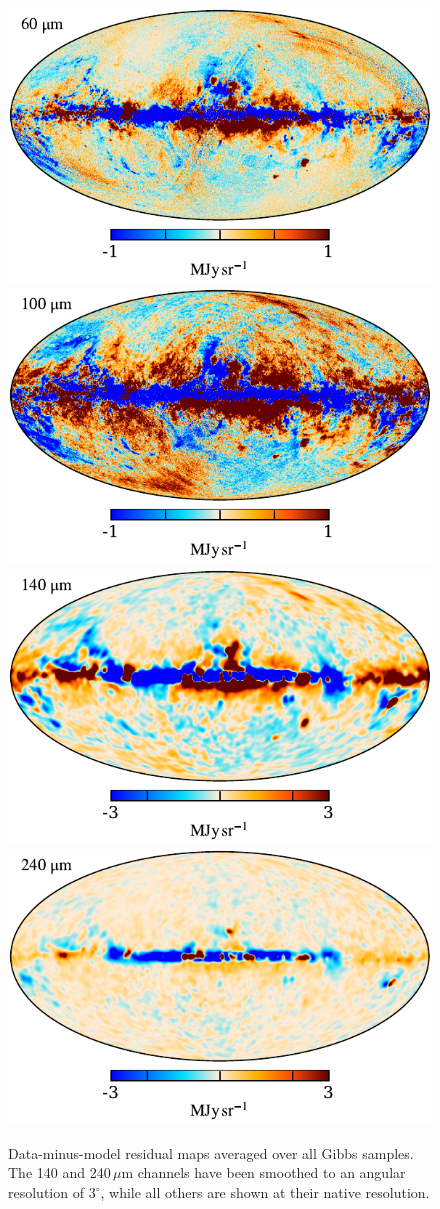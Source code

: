 \documentclass{aa}
\begin{document}
\begin{figure}
       	\includegraphics[width=0.35\linewidth]{figs/todres_07.pdf}
       	\includegraphics[width=0.35\linewidth]{figs/todres_08.pdf}\\       
       	\includegraphics[width=0.35\linewidth]{figs/todres_09.pdf}
       	\includegraphics[width=0.35\linewidth]{figs/todres_10.pdf}       
       	\caption{Data-minus-model residual maps averaged over all Gibbs samples. The 140 and 240\,$\mu$m channels have been smoothed to an angular resolution of $3^{\circ}$, while all others are shown at their native resolution. }
       	\label{fig:res}
       \end{figure}
\end{document}
